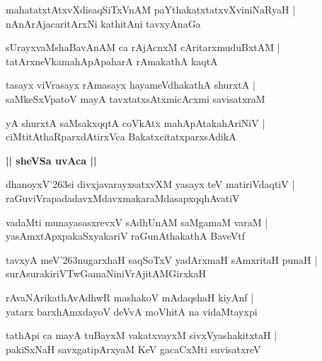 \documentclass[twoside,12pt,openright]{book}
\def\S{\char'263}
\newcounter{shloka}[chapter]
\def\uvaca#1{\centerline{{\large\textbf{#1}}}}
\begin{document}
\begin{shloka}%
mahatatxtAtxvXdisaqSiTxVnAM  paYthakatxtatxvXviniNaRyaH |\\
nAnArAjacaritArxNi kathitAni tavxyAnaGa
\end{shloka}

\begin{shloka}%
sUrayxvaMshaBavAnAM ca rAjAcnxM cAritarxmuduBxtAM |\\
tatArxneVkamahApApaharA rAmakathA kaqtA
\end{shloka}

\begin{shloka}%
tasayx viVrasayx rAmasayx hayameVdhakathA shurxtA |\\
saMkeSxVpatoV mayA tavxtatxsAtxmicAcxmi savisatxraM 
\end{shloka}

\begin{shloka}%
yA shurxtA saMsakxqqtA coVkAtx mahApAtakahAriNiV |\\
ciMtitAthaRparxdAtirxVca BakatxcitatxparxsAdikA
\end{shloka}

\uvaca{|| sheVSa uvAca ||}

\begin{shloka}%
dhanoyxV\S si divxjavarayxsatxvXM yasayx teV matiriVdaqtiV |\\
raGuviVrapadadavxMdavxmakaraMdasapxqqhAvatiV
\end{shloka}

\begin{shloka}%
vadaMti munayasasxrevxV sAdhUnAM saMgamaM varaM |\\
yasAmxtApxpakaSxyakariV raGunAthakathA BaveVtf
\end{shloka}

\begin{shloka}%
tavxyA meV\S nugarxhaH saqSoTxV yadArxmaH sAmxritaH punaH |\\
surAsurakiriVTwGamaNiniVrAjitAMGirxkaH
\end{shloka}

\begin{shloka}%
rAvaNArikathAvAdhwR mashakoV mAdaqshaH kiyAnf |\\
yatarx barxhAmxdayoV deVvA moVhitA na vidaMtayxpi
\end{shloka}

\begin{shloka}%
tathApi  ca mayA tuBayxM vakatxvayxM sivxVyashakitxtaH |\\
pakiSxNaH savxgatipArxyaM KeV gacaCxMti suvisatxreV 
\end{shloka}
\end{document}
